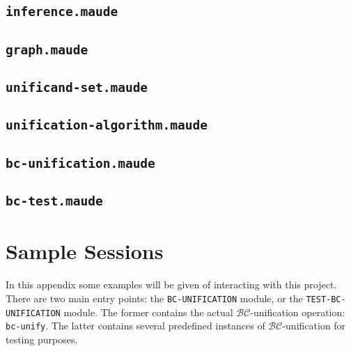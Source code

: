 \documentclass[11pt,twoside,titlepage]{article}
\newcommand{\BC}{\mathcal{BC}}
\newcommand{\TitleListing}[1]{\texorpdfstring{\lstinline|#1|}{#1}}
\begin{document}
\subsection{\TitleListing{inference.maude}}
\label{subappendix:inference-mod}

\clearpage

\subsection{\TitleListing{graph.maude}}
\label{subappendix:graph-mod}

\clearpage

\subsection{\TitleListing{unificand-set.maude}}
\label{subappendix:unificand-set-mod}

\clearpage

\subsection{\TitleListing{unification-algorithm.maude}}
\label{subappendix:unif-alg-theory}

\clearpage

\subsection{\TitleListing{bc-unification.maude}}
\label{subappendix:bc-unif-mod}

\clearpage

\subsection{\TitleListing{bc-test.maude}}
\label{subappendix:test-mod}


\clearpage
\section{Sample Sessions}\label{appendix:samples}

In this appendix some examples will be given of interacting with this project.
There are two main entry points: the \lstinline|BC-UNIFICATION| module, or the
\lstinline|TEST-BC-UNIFICATION| module. The former contains the actual
$\BC$-unification operation: \lstinline|bc-unify|. The latter contains several
predefined instances of $\BC$-unification for testing purposes.
\end{document}

